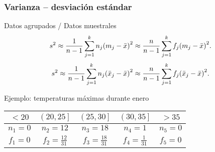 \documentclass[table]{beamer}
\begin{document}
\begin{frame}
    \frametitle{Varianza -- desviación estándar}
    \begin{block}{Datos agrupados / Datos muestrales}
        \begin{equation*}
            s^{2} \approx \frac{1}{n - 1} \sum_{j = 1}^{k} n_{j} \parens{m_{j} - \bar{x}}^{2}
            \approx \frac{n}{n - 1} \sum_{j = 1}^{k} f_{j} \parens{m_{j} - \bar{x}}^{2} .
        \end{equation*}
        \begin{equation*}
            s^{2} \approx \frac{1}{n - 1} \sum_{j = 1}^{k} n_{j} \parens{\bar{x}_{j} - \bar{x}}^{2}
            \approx \frac{n}{n - 1} \sum_{j = 1}^{k} f_{j} \parens{\bar{x}_{j} - \bar{x}}^{2} .
        \end{equation*}
    \end{block}
    \begin{exampleblock}{Ejemplo: temperaturas máximas durante enero}
        \begin{center}
            \begin{tabular}{c|c|c|c|c}
                $< 20$ & $\left ( 20 , 25 \right ]$ & $\left ( 25 , 30 \right ]$ & $\left ( 30 , 35 \right ]$ & $> 35$ \\
                \hline
                $n_{1} = 0$ & $n_{2} = 12$ & $n_{3} = 18$ & $n_{4} = 1$ & $n_{5} = 0$ \\
                \hline
                $f_{1} = 0$ & $f_{2} = \frac{12}{31}$ & $f_{3} = \frac{18}{31}$ & $f_{4} = \frac{1}{31}$ & $f_{5} = 0$ \\
            \end{tabular}
        \end{center}
    \end{exampleblock}
\end{frame}
\end{document}

